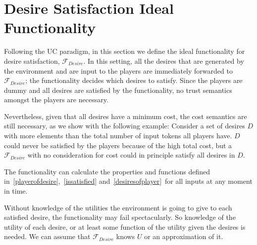 \section{Desire Satisfaction Ideal Functionality}
  Following the UC paradigm, in this section we define the ideal functionality for desire satisfaction, $\mathcal{F}_{Desire}$.
  In this setting, all the desires that are generated by the environment and are input to the players are immediately forwarded
  to $\mathcal{F}_{Desire}$; the functionality decides which desires to satisfy. Since the players are dummy and all desires
  are satisfied by the functionality, no trust semantics amongst the players are necessary.
  
  Nevertheless, given that all desires have a minimum cost, the cost semantics are still necessary, as we show with the
  following example: Consider a set of desires $D$ with more elements than the total number of input tokens all players have.
  $D$ could never be satisfied by the players because of the high total cost, but a $\mathcal{F}_{Desire}$ with no
  consideration for cost could in principle satisfy all desires in $D$.

  The functionality can calculate the properties and functions defined in~\ref{playerofdesire},~\ref{issatisfied}
  and~\ref{desiresofplayer}\ for all inputs at any moment in time.

  Without knowledge of the utilities the environment is going to give to each satisfied desire, the functionality may fail
  spectacularly. So knowledge of the utility of each desire, or at least some function of the utility given the desires is
  needed. We can assume that $\mathcal{F}_{Desire}$ knows $U$ or an approximation of it.
